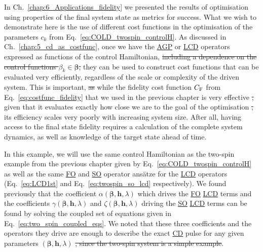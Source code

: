 \documentclass[a4paper,oneside,11pt]{book}
\newcommand{\betabb}{\boldsymbol{\beta}}
\newcommand{\hbb}{\boldsymbol{h}}
\newcommand{\acrref}[1]{\hyperref[acr:#1]{#1}}
\providecommand{\DIFaddtex}[1]{{\protect\color{blue}\uwave{#1}}} %
\providecommand{\DIFdeltex}[1]{{\protect\color{red}\sout{#1}}}                      %
\providecommand{\DIFaddbegin}{} %
\providecommand{\DIFaddend}{} %
\providecommand{\DIFdelbegin}{} %
\providecommand{\DIFdelend}{} %
\providecommand{\DIFadd}[1]{\texorpdfstring{\DIFaddtex{#1}}{#1}} %
\providecommand{\DIFdel}[1]{\texorpdfstring{\DIFdeltex{#1}}{}} %
\newcommand{\DIFscaledelfig}{0.5}
\newlength{\DIFdelgraphicswidth} %
\newlength{\DIFdelgraphicsheight} %
\newcommand{\DIFaddincludegraphics}[2][]{{\color{blue}\fbox{\DIFOincludegraphics[#1]{#2}}}} %
\newcommand{\DIFdelincludegraphics}[2][]{%
\sbox{\DIFdelgraphicsbox}{\DIFOincludegraphics[#1]{#2}}%
\settoboxwidth{\DIFdelgraphicswidth}{\DIFdelgraphicsbox} %
\settoboxtotalheight{\DIFdelgraphicsheight}{\DIFdelgraphicsbox} %
\scalebox{\DIFscaledelfig}{%
\parbox[b]{\DIFdelgraphicswidth}{\usebox{\DIFdelgraphicsbox}\\[-\baselineskip] \rule{\DIFdelgraphicswidth}{0em}}\llap{\resizebox{\DIFdelgraphicswidth}{\DIFdelgraphicsheight}{%
\setlength{\unitlength}{\DIFdelgraphicswidth}%
\begin{picture}(1,1)%
\thicklines\linethickness{2pt} %
{\color[rgb]{1,0,0}\put(0,0){\framebox(1,1){}}}%
{\color[rgb]{1,0,0}\put(0,0){\line( 1,1){1}}}%
{\color[rgb]{1,0,0}\put(0,1){\line(1,-1){1}}}%
\end{picture}%
}\hspace*{3pt}}} %
} %
\DeclareRobustCommand{\DIFaddbegin}{\DIFOaddbegin \let\includegraphics\DIFaddincludegraphics} %
\DeclareRobustCommand{\DIFaddend}{\DIFOaddend \let\includegraphics\DIFOincludegraphics} %
\DeclareRobustCommand{\DIFdelbegin}{\DIFOdelbegin \let\includegraphics\DIFdelincludegraphics} %
\DeclareRobustCommand{\DIFdelend}{\DIFOaddend \let\includegraphics\DIFOincludegraphics} %
\begin{document}
In Ch.~\ref{chap:6_Applications_fidelity} we presented the results of optimisation using properties of the final system state as metrics for success. What we wish to demonstrate here is the use of different cost functions in the optimisation of the parameters $c_k$ from Eq.~\eqref{eq:COLD_twospin_controlH}. As discussed in Ch.~\ref{chap:5_cd_as_costfunc}, once we have the \acrref{AGP} or \acrref{LCD} operators expressed as functions of the control Hamiltonian, \DIFdelbegin \DIFdel{including a dependence on the control functions $\beta_k \in \betabb$, }\DIFdelend they can be used to construct cost functions that can be evaluated very efficiently, regardless of the scale or complexity of the driven system. This is important, \DIFdelbegin \DIFdel{as }\DIFdelend \DIFaddbegin \DIFadd{because }\DIFaddend while the fidelity cost function $C_{\rm F}$ from Eq.~\eqref{eq:costfunc_fidelity} that we used in the previous chapter is very effective \DIFdelbegin \DIFdel{, }\DIFdelend \DIFaddbegin \DIFadd{-- }\DIFaddend given that it evaluates exactly how close we are to the \DIFaddbegin \DIFadd{true }\DIFaddend goal of the optimisation \DIFdelbegin \DIFdel{, }\DIFdelend \DIFaddbegin \DIFadd{-- }\DIFaddend its efficiency scales very poorly with increasing system size. After all, having access to the final state fidelity requires a calculation of the complete system dynamics, as well as \DIFaddbegin \DIFadd{full }\DIFaddend knowledge of the target state ahead of time. 

In this example, we will use the same control Hamiltonian as the two-spin example from the previous chapter given by Eq.~\eqref{eq:COLD_twospin_controlH} as well as the same \acrref{FO} and \acrref{SO} operator ans\"{a}tze for the \acrref{LCD} operators (Eq.~\eqref{eq:LCD1st} and Eq.~\eqref{eq:twospin_so_lcd} respectively). We found previously that the coefficient $\alpha(\betabb, \hbb, \lambda)$ which drives the \acrref{FO} \acrref{LCD} terms and the coefficients $\gamma(\betabb, \hbb, \lambda)$ and $\zeta(\betabb, \hbb, \lambda)$ driving the \acrref{SO} \acrref{LCD} terms can be found by solving the coupled set of equations given in Eq.~\eqref{eq:two_spin_coupled_eqs}. We noted that these three coefficients and the operators they drive are enough to describe the exact \acrref{CD} pulse for any given parameters $(\betabb, \hbb, \lambda)$ \DIFdelbegin \DIFdel{, since the two-spin system is a simple example}\DIFdelend \DIFaddbegin \DIFadd{in the case of two spins}\DIFaddend .
\end{document}
